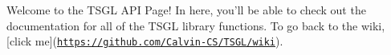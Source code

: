 \-Welcome to the \-T\-S\-G\-L \-A\-P\-I \-Page! \-In here, you'll be able to check out the documentation for all of the \-T\-S\-G\-L library functions. \-To go back to the wiki, \mbox{[}click me\mbox{]}(\href{https://github.com/Calvin-CS/TSGL/wiki}{\tt https\-://github.\-com/\-Calvin-\/\-C\-S/\-T\-S\-G\-L/wiki}).